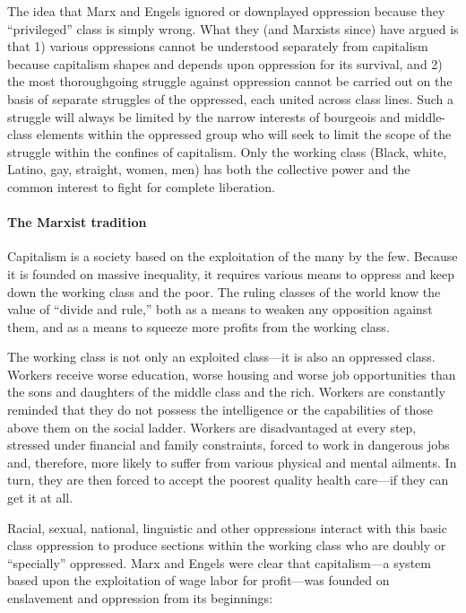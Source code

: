 The idea that Marx and Engels ignored or downplayed oppression because they ``privileged'' class is simply wrong. What they (and Marxists since) have argued is that 1) various oppressions cannot be understood separately from capitalism because capitalism shapes and depends upon oppression for its survival, and 2) the most thoroughgoing struggle against oppression cannot be carried out on the basis of separate struggles of the oppressed, each united across class lines. Such a struggle will always be limited by the narrow interests of bourgeois and middle-class elements within the oppressed group who will seek to limit the scope of the struggle within the confines of capitalism. Only the working class (Black, white, Latino, gay, straight, women, men) has both the collective power and the common interest to fight for complete liberation.

\paragraph{The Marxist tradition}

Capitalism is a society based on the exploitation of the many by the few. Because it is founded on massive inequality, it requires various means to oppress and keep down the working class and the poor. The ruling classes of the world know the value of ``divide and rule,'' both as a means to weaken any opposition against them, and as a means to squeeze more profits from the working class.

The working class is not only an exploited class---it is also an oppressed class. Workers receive worse education, worse housing and worse job opportunities than the sons and daughters of the middle class and the rich. Workers are constantly reminded that they do not possess the intelligence or the capabilities of those above them on the social ladder. Workers are disadvantaged at every step, stressed under financial and family constraints, forced to work in dangerous jobs and, therefore, more likely to suffer from various physical and mental ailments. In turn, they are then forced to accept the poorest quality health care---if they can get it at all.

Racial, sexual, national, linguistic and other oppressions interact with this basic class oppression to produce sections within the working class who are doubly or ``specially'' oppressed. Marx and Engels were clear that capitalism---a system based upon the exploitation of wage labor for profit---was founded on enslavement and oppression from its beginnings:

